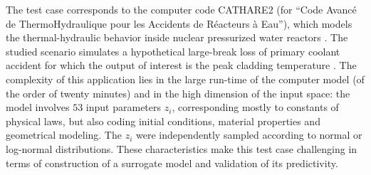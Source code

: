 The test case corresponds to the computer code CATHARE2 (for ``Code Avanc\'e de ThermoHydraulique pour les Accidents de R\'eacteurs \`a Eau''), which models the thermal-hydraulic behavior inside nuclear pressurized water reactors \citep{gefant11}. 
The studied scenario simulates a hypothetical large-break loss of primary coolant accident for which the output of interest is the peak cladding temperature \citep{decbaz08,ioobou10}. 
The complexity of this application lies in the large run-time of the computer model (of the order of twenty minutes) and in the high dimension of the input space: the model involves $53$ input parameters $z_i$, corresponding mostly to constants of physical laws, but also coding initial conditions, material properties and geometrical modeling. 
The $z_i$ were independently sampled according to normal or log-normal distributions. %
These characteristics make this test case challenging in terms of construction of a surrogate model and validation of its predictivity.


